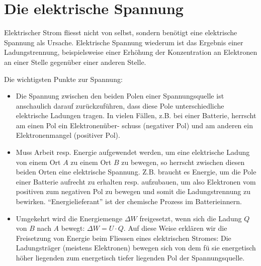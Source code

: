 \documentclass[11pt,twoside=false,open=any]{scrbook}
\begin{document}
\section{Die elektrische Spannung}
Elektrischer Strom fliesst nicht von selbst, sondern benötigt eine elektrische Spannung als Ursache. Elektrische Spannung wiederum ist das Ergebnis einer Ladungstrennung, beispielsweise einer Erhöhung der Konzentration an Elektronen an einer Stelle gegenüber einer anderen Stelle.
\begin{center}
   \setlength{\fboxrule}{2pt}
\end{center}
Die wichtigsten Punkte zur Spannung:
\begin{itemize}
    \item Die Spannung zwischen den beiden Polen einer Spannungsquelle ist anschaulich
darauf zurückzuführen, dass diese Pole unterschiedliche elektrische Ladungen 
tragen. In vielen Fällen, z.B. bei einer Batterie, herrscht am einen Pol ein Elektronenüber-
schuss (negativer Pol) und am anderen ein Elektronenmangel (positiver Pol).
    \item Muss Arbeit resp. Energie aufgewendet werden, um eine elektrische Ladung von einem
Ort $A$ zu einem Ort $B$ zu bewegen, so herrscht zwischen diesen beiden Orten eine elektrische
Spannung. Z.B. braucht es Energie, um die Pole einer Batterie aufrecht zu erhalten
resp. aufzubauen, um also Elektronen vom positiven zum negativen Pol zu bewegen und
somit die Ladungstrennung zu bewirken. ``Energielieferant'' ist der chemische Prozess im
Batterieinnern.
\item Umgekehrt wird die Energiemenge $\Delta W$ freigesetzt, wenn sich die Ladung $Q$ von $B$ nach
$A$ bewegt: $\Delta W = U \cdot Q$. Auf diese Weise erklären wir die Freisetzung von Energie beim Fliessen eines elektrischen
Stromes: Die Ladungsträger (meistens Elektronen) bewegen sich von dem fü sie
energetisch höher liegenden zum energetisch tiefer liegenden Pol der Spannungsquelle.
\end{itemize}
\end{document}
